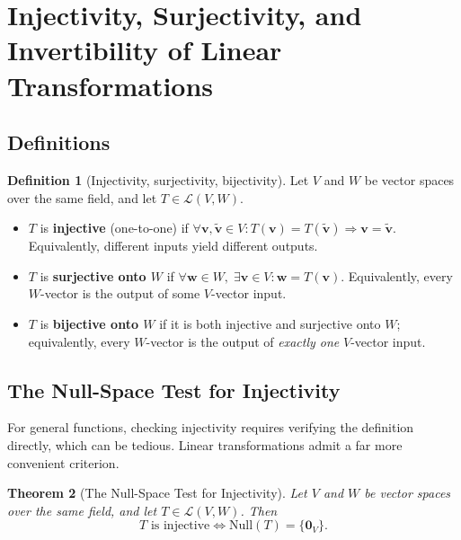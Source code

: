 \documentclass[11pt, a4paper, notitlepage]{report}
\newtheorem{theorem}{Theorem}[section]
\theoremstyle{definition}
\newtheorem{definition}[theorem]{Definition}
\theoremstyle{remark}
\begin{document}

\section{Injectivity, Surjectivity, and Invertibility of Linear Transformations}
\label{sec:injectivity-surjectivity}

\subsection{Definitions}

\begin{definition}[Injectivity, surjectivity, bijectivity]
\label{def:injective-surjective}
Let $V$ and $W$ be vector spaces over the same field, and let $T \in \mathcal{L}(V,W)$.
\begin{itemize}
  \item $T$ is \textbf{injective} (one-to-one) if
        $\forall \mathbf{v}, \tilde{\mathbf{v}} \in V : T(\mathbf{v}) = T(\tilde{\mathbf{v}})
        \Rightarrow \mathbf{v} = \tilde{\mathbf{v}}$.
        Equivalently, different inputs yield different outputs.
  \item $T$ is \textbf{surjective onto $W$} if
        $\forall \mathbf{w} \in W,\; \exists \mathbf{v} \in V : \mathbf{w} = T(\mathbf{v})$.
        Equivalently, every $W$-vector is the output of some $V$-vector input.
  \item $T$ is \textbf{bijective onto $W$} if it is both injective and surjective onto $W$;
        equivalently, every $W$-vector is the output of \emph{exactly one} $V$-vector input.
\end{itemize}
\end{definition}

\subsection{The Null-Space Test for Injectivity}

For general functions, checking injectivity requires verifying the definition directly, which
can be tedious.  Linear transformations admit a far more convenient criterion.

\begin{theorem}[The Null-Space Test for Injectivity]
\label{thm:null-space-injectivity}
Let $V$ and $W$ be vector spaces over the same field, and let $T \in \mathcal{L}(V,W)$.  Then
\[
  T \text{ is injective} \iff \mathrm{Null}(T) = \{\mathbf{0}_V\}.
\]
\end{theorem}
\end{document}
